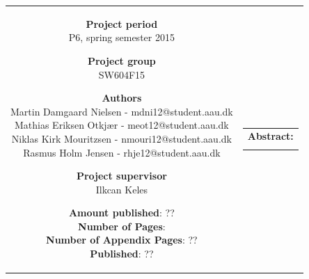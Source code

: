 \begin{nopagebreak}
{\begin{tabular}{cc}
{        \textbf{Project period}     \\ P6, spring semester 2015  \\

        \textbf{Project group}      \\ SW604F15                  \\

        \textbf{Authors}            \\
        Martin Damgaard Nielsen - mdni12@student.aau.dk    \\
        Mathias Eriksen Otkjær  - meot12@student.aau.dk    \\
        Niklas Kirk Mouritzsen  - nmouri12@student.aau.dk  \\
        Rasmus Holm Jensen      -  rhje12@student.aau.dk   \\

        \textbf{Project supervisor} \\ Ilkcan Keles    \\

        \textbf{Amount published}: ??                  \\
        \textbf{Number of Pages}: \pageref{LastPage}   \\
        \textbf{Number of Appendix Pages}: ??          \\
        \textbf{Published}: ??                         \\

        \vfill 

    } &
    \parbox{7cm}
    {
        \vspace{.15cm}
        \hfill 
        \begin{tabular}{l}
            {\bf Abstract:}\bigskip \\
            \fbox{
                \parbox{7cm}
                {
                    \bigskip
                    {\vfill{\small \bigskip}}
                }
            }
        \end{tabular}
    }

\end{tabular}}
\\ \\ \\ \\ \\ \\ \\ \\ \\ \\ \\ \\ \\
\begin{center}
\end{center}

\restoregeometry
\end{nopagebreak}